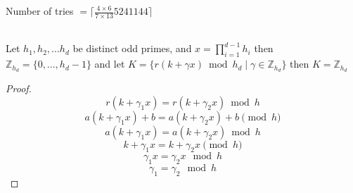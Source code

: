 \documentclass{article}
\begin{document}
{%
Number of tries $= \lceil \frac{4 \times 6}{7 \times 13}  5241144 \rceil$\\
~\\
\begin{proposition}
Let $h_1,h_2,...h_d$ be distinct odd primes, and $x = \prod_{i=1}^{d-1} h_i$ then
$\mathbb{Z}_{h_d} = \{0,...,h_d-1\}$
and let $K = \{r(k+\gamma x) \bmod h_d \mid \gamma \in \mathbb{Z}_{h_d}\}$
then $K = \mathbb{Z}_{h_d}$\\
\end{proposition}
\begin{proof}
$$ r(k+ \gamma_1 x) = r(k+ \gamma_2 x) \bmod h $$
$$ a(k+ \gamma_1 x) + b = a(k+ \gamma_2 x) + b \pmod h $$
$$ a(k+ \gamma_1 x) = a(k+ \gamma_2 x) \bmod h $$
$$ k+ \gamma_1 x = k+ \gamma_2 x \pmod h $$
$$ \gamma_1 x = \gamma_2 x \mod h $$
$$ \gamma_1 = \gamma_2 \mod h $$
\end{proof}
}
\end{document}
